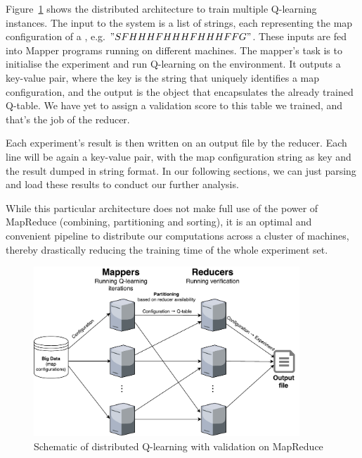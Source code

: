 Figure~\ref{fig:MapReduce} shows the distributed architecture to train multiple Q-learning instances. The input to the system is a list of strings, each representing the map configuration of a , e.g. $"SFHHHFHHHFHHHFFG"$. These inputs are fed into Mapper programs running on different machines. The mapper's task is to initialise the experiment and run Q-learning on the environment. It outputs a key-value pair, where the key is the string that uniquely identifies a map configuration, and the output is the  object that encapsulates the already trained Q-table. We have yet to assign a validation score to this table we trained, and that's the job of the reducer.

Each experiment's result is then written on an output file by the reducer. Each line will be again a key-value pair, with the map configuration string as key and the  result dumped in string format. In our following sections, we can just parsing and load these results to conduct our further analysis.

While this particular architecture does not make full use of the power of MapReduce (combining, partitioning and sorting), it is an optimal and convenient pipeline to distribute our computations across a cluster of machines, thereby drastically reducing the training time of the whole experiment set.
\begin{figure}
\centering
\includegraphics[width=10cm]{Figures/MapReduce}
\caption{Schematic of distributed Q-learning with validation on MapReduce}
\label{fig:MapReduce}
\end{figure}

